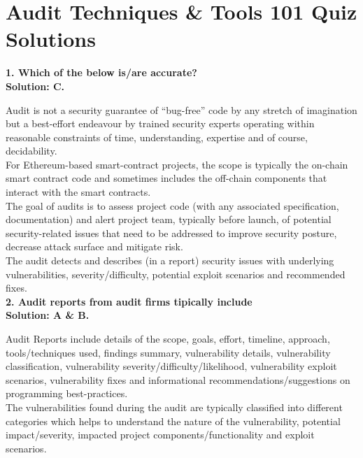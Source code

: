 \section{Audit Techniques \& Tools 101 Quiz Solutions}

\textbf{1. Which of the below is/are accurate?}\label{sec:exam6_q1}\\

\textbf{Solution: C.}

Audit is not a security guarantee of ``bug-free'' code by any stretch of imagination but a best-effort endeavour by trained security experts operating within reasonable constraints of time, understanding, expertise and of course, decidability.\\

For Ethereum-based smart-contract projects, the scope is typically the on-chain smart contract code and sometimes includes the off-chain components that interact with the smart contracts.\\

The goal of audits is to assess project code (with any associated specification, documentation) and alert project team, typically before launch, of potential security-related issues that need to be addressed to improve security posture, decrease attack surface and mitigate risk.\\

The audit detects and describes (in a report) security issues with underlying vulnerabilities, severity/difficulty, potential exploit scenarios and recommended fixes.\\

\textbf{2. Audit reports from audit firms tipically include}\label{sec:exam6_q2}\\

\textbf{Solution: A \& B.}

Audit Reports include details of the scope, goals, effort, timeline, approach, tools/techniques used, findings summary, vulnerability details, vulnerability classification, vulnerability severity/difficulty/likelihood, vulnerability exploit scenarios, vulnerability fixes and informational recommendations/suggestions on programming best-practices.\\

The vulnerabilities found during the audit are typically classified into different categories which helps to understand the nature of the vulnerability, potential impact/severity, impacted project components/functionality and exploit scenarios.\\

